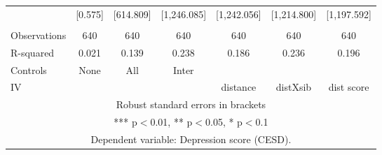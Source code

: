 \begin{tabular}{lcccccc}
 & [0.575] & [614.809] & [1,246.085] & [1,242.056] & [1,214.800] & [1,197.592] \\
 &  &  &  &  &  &  \\
Observations & 640 & 640 & 640 & 640 & 640 & 640 \\
R-squared & 0.021 & 0.139 & 0.238 & 0.186 & 0.236 & 0.196 \\
Controls & None & All & Inter &  &  &  \\
 IV &  &  &  & distance & distXsib & dist score \\ \hline
\multicolumn{7}{c}{ Robust standard errors in brackets} \\
\multicolumn{7}{c}{ *** p$<$0.01, ** p$<$0.05, * p$<$0.1} \\
\multicolumn{7}{c}{ Dependent variable: Depression score (CESD).} \\
\end{tabular}
